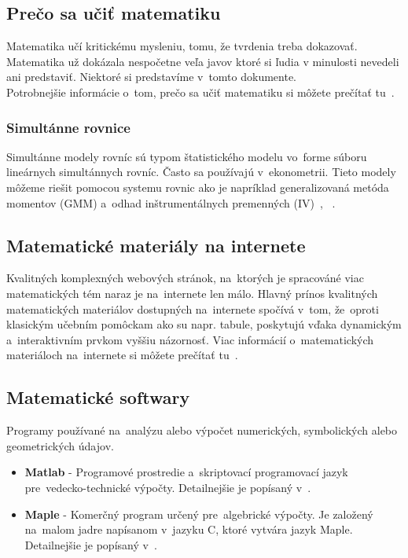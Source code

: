 \documentclass[a4paper, 11pt]{article}
\begin{document}
\subsection{Prečo sa učiť matematiku}
Matematika učí kritickému mysleniu, tomu, že tvrdenia treba dokazovať. Matematika už dokázala nespočetne veľa javov ktoré si ľudia v minulosti nevedeli ani predstaviť. Niektoré si predstavíme v~tomto dokumente.\\
Potrobnejšie informácie o~tom, prečo sa učiť matematiku si môžete prečítať tu~\cite{dudley1966convergence}.

\subsubsection{\small{Simultánne rovnice}}
Simultánne modely rovníc sú typom štatistického modelu vo~forme súboru lineárnych simultánnych rovníc. Často sa používajú v~ekonometrii. Tieto modely môžeme riešit pomocou systemu rovnic ako je napríklad generalizovaná metóda momentov (GMM) a~odhad inštrumentálnych premenných (IV)~\cite{smith}, ~\cite{todhunter}.

\subsection{Matematické materiály na internete}
Kvalitných komplexných webových stránok, na~ktorých je spracováné viac matematických tém naraz je na~internete len málo. Hlavný prínos kvalitných  matematických materiálov dostupných na~internete spočívá v~tom, že~oproti klasickým učebním pomôckam ako su napr. tabule, poskytujú vďaka dynamickým a~interaktivním prvkom vyššiu názornosť. Viac informácií o~matematických materiáloch na~internete si môžete prečítať tu~\cite{robova2008webove}. 

\subsection{Matematické softwary}
Programy používané na~analýzu alebo výpočet numerických, symbolických alebo geometrických údajov.
\begin{itemize}
    \item \textbf{Matlab} - Programové prostredie a~skriptovací programovací jazyk pre~vedecko-technické výpočty. Detailnejšie je popísaný v~\cite{ANDERSSON20001}.
    \item \textbf{Maple} - Komerčný program určený pre~algebrické výpočty. Je založený na~malom jadre napísanom v~jazyku C, ktoré vytvára jazyk Maple. Detailnejšie je popísaný v~\cite{chvatalova2007maple}.
\end{itemize}


\newpage

\renewcommand{\refname}{Literatúra}

\end{document}
